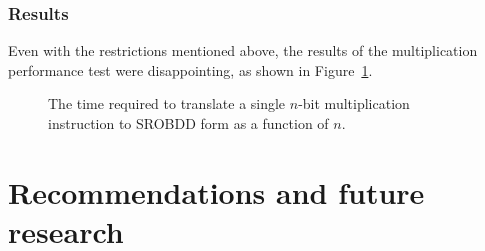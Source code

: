 \documentclass[a4paper,11pt]{kth-mag}
\begin{document}
\subsection{Results}

Even with the restrictions mentioned above, the results of the multiplication performance test were disappointing, as shown in Figure~\ref{fig:performance_mul}.

\begin{figure}
\centering

\caption{The time required to translate a single $n$-bit multiplication instruction to SROBDD form as a function of $n$.}
\label{fig:performance_mul}
\end{figure}


\chapter{Recommendations and future research}
\label{ch:recommendations_future_research}



\end{document}

